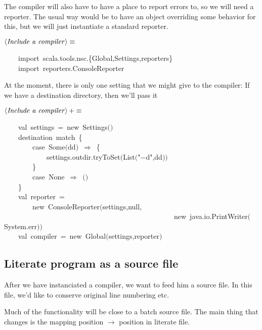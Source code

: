 \documentclass[a4paper,12pt]{article}
\begin{document}
The compiler will also have to have a place to report errors to,
so we will need a reporter. The usual way would be to have an object
overriding some behavior for this, but we will just instantiate a
standard reporter.

$\left<\mbox{\emph{Include a compiler}}\right>\equiv$
\begin{program}~~~~{\vem import}~scala.tools.nsc.{\small\{}Global,Settings,reporters{\small\}}
\\~~~~{\vem import}~reporters.ConsoleReporter
\\[0.5em]\end{program}


At the moment, there is only one setting that we might give to the compiler:
If we have a destination directory, then we'll pass it

$\left<\mbox{\emph{Include a compiler}}\right>+\equiv$
\begin{program}~~~~{\vem val}~settings~=~{\vem new}~Settings$($$)$
\\~~~~destination~{\vem match}~{\small\{}
\\~~~~~~~~{\vem case}~Some$($dd$)$~$\Rightarrow$~{\small\{}
\\~~~~~~~~~~~~settings.outdir.tryToSet$($List$($"$-$d",dd$)$$)$
\\~~~~~~~~{\small\}}
\\~~~~~~~~{\vem case}~None~$\Rightarrow$~$($$)$
\\~~~~{\small\}}
\\~~~~{\vem val}~reporter~=
\\~~~~~~~~{\vem new}~ConsoleReporter$($settings,{\vem null},
\\~~~~~~~~~~~~~~~~~~~~~~~~~~~~~~~~~~~~~~~~~~~~~~~~{\vem new}~java.io.PrintWriter$($System.err$)$$)$
\\~~~~{\vem val}~compiler~=~{\vem new}~Global$($settings,reporter$)$
\\[0.5em]\end{program}


\subsection{Literate program as a source file}
After we have instanciated a compiler, we want to feed him a source
file. In this file, we'd like to conserve original line numbering etc.

Much of the functionality will be close to a batch source file. The main
thing that changes is the mapping position $\rightarrow$ position in literate
file.
\end{document}
